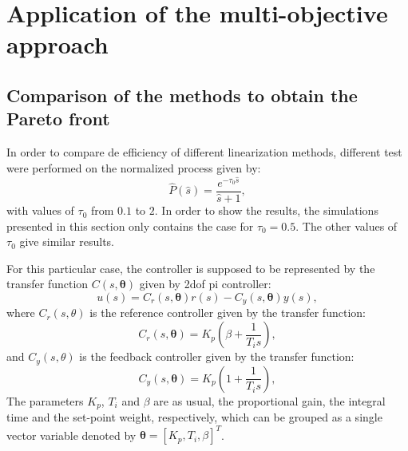 \chapter{Application of the multi-objective approach}
\label{chap:ApplicationExamplesNoGUI}


\section{Comparison of the methods to obtain the Pareto front}
\label{sec:Comparison}
In order to compare de efficiency of different linearization methods, different test were performed on the normalized process given by:
%
\begin{equation}
\hat{P}(\hat{s}) = \frac{e^{-\tau_0 \hat{s}}}{\hat{s}+1},
\label{eq:NormP}
\end{equation}
%
with values of $\tau_0$ from $0.1$ to $2$. In order to show the results, the simulations presented in this section only contains the case for $\tau_0=0.5$. The other values of $\tau_0$ give similar results.

For this particular case, the controller is supposed to be represented by the transfer function $C(s,\bm{\theta})$ given by \gls{2dof} \gls{pi} controller:
\begin{equation}
u(s) = C_r(s,\bm{\theta}) r(s) - C_y(s,\bm{\theta}) y(s),
\label{eq:2PIControl}
\end{equation}
where $C_r(s,\theta)$ is the reference controller given by the transfer function:
\begin{equation}
C_r(s,\bm{\theta})= K_p \left(\beta + \frac{1}{T_i s} \right),
\label{eq:CrControl}
\end{equation}
%
and $C_y(s,\theta)$ is the feedback controller given by the transfer function:
\begin{equation}
C_y(s,\bm{\theta})=K_p \left(1 + \frac{1}{T_i s} \right),
\label{eq:CyControl}
\end{equation}
%
The parameters $K_p$, $T_i$ and $\beta$ are as usual, the proportional gain, the integral time and the set-point weight, respectively, which can be grouped as a single vector variable denoted by $\bm{\theta}=\left[K_p,T_i,\beta\right]^{T}$.

